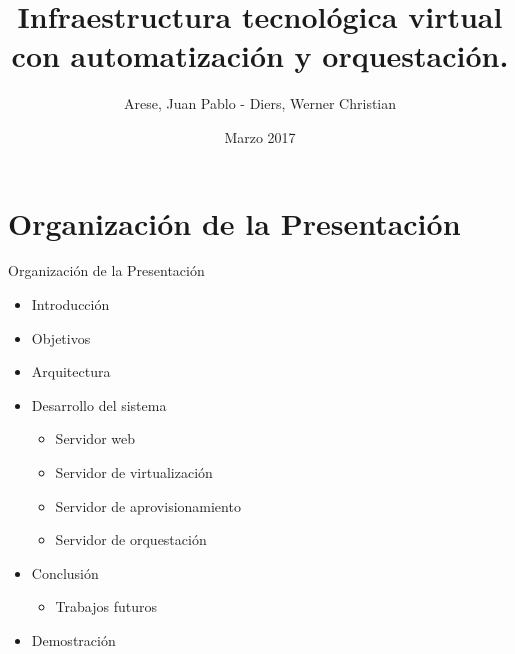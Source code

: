 \usepackage[english]{babel}
\usepackage[utf8x]{inputenc}

\title[Your Short Title]{Infraestructura tecnológica virtual con automatización y orquestación.}
\author{Arese, Juan Pablo - Diers, Werner Christian}
\date{Marzo 2017}




\begin{frame}
  \titlepage
\end{frame}


\section{Organización de la Presentación}

\begin{frame}{Organización de la Presentación}
    \vspace{-1cm}
    \begin{itemize}
        \item Introducción
        \item Objetivos
        \item Arquitectura
        \item Desarrollo del sistema
        \begin{itemize}
            \item Servidor web
            \item Servidor de virtualización
            \item Servidor de aprovisionamiento
            \item Servidor de orquestación          
        \end{itemize}
        \item Conclusión
        \begin{itemize}
            \item Trabajos futuros
        \end{itemize}
        \item Demostración
    \end{itemize}

\end{frame}


